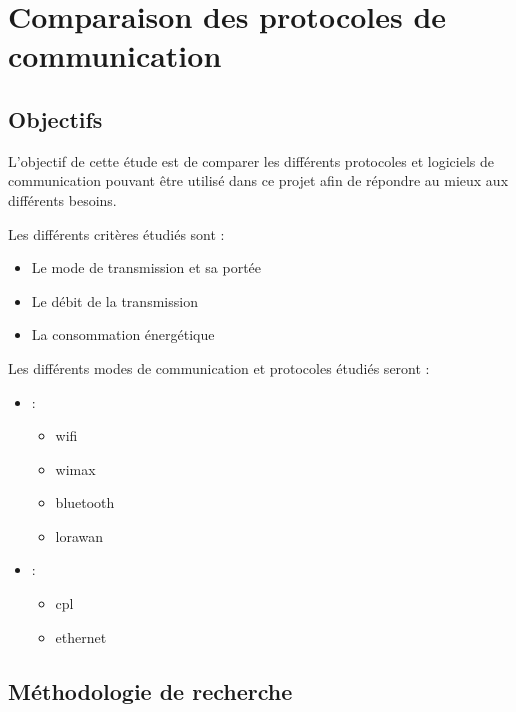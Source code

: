 \section{Comparaison des protocoles de communication}
\label{sec:comparaisonProtocoleCommnunication}

\subsection{Objectifs}
\label{sec:comparaisonProtocoleCommnunicationObjectifs}

L'objectif de cette étude est de comparer les différents protocoles et logiciels de communication
pouvant être utilisé dans ce projet afin de répondre au mieux aux différents besoins.\newline

Les différents critères étudiés sont :

\begin{itemize}
    \item Le mode de transmission et sa portée
    \item Le débit de la transmission
    \item La consommation énergétique
\end{itemize}

Les différents modes de communication et protocoles étudiés seront :

\begin{itemize}
    \item {} :
          \begin{itemize}
              \item \Gls{wifi}
              \item \Gls{wimax}
              \item \Gls{bluetooth}
              \item \Gls{lorawan}
          \end{itemize}
    \item {} :
          \begin{itemize}
              \item \Gls{cpl}
              \item \Gls{ethernet}
          \end{itemize}
\end{itemize}

\subsection{Méthodologie de recherche}
\label{sec:centralise_Methodo}

